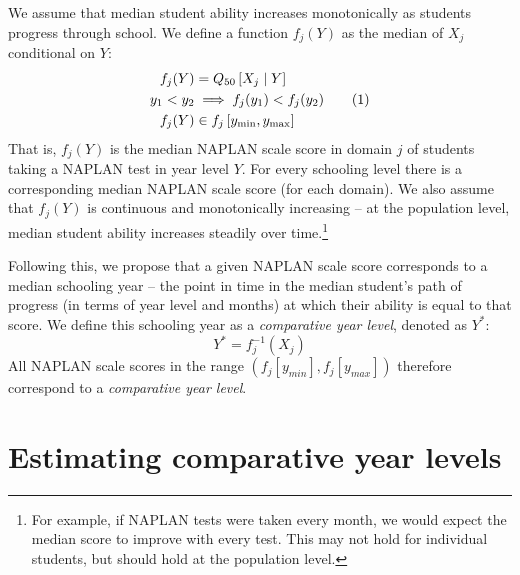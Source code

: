 We assume that median student ability increases monotonically as students progress through school. We define a function $f_{j}(Y)$ as the median of $X_{j}$ conditional on $Y$:
\newcommand\numberthis{\addtocounter{equation}{1}\tag{\theequation}}
\begin{align*}
 f_{j}(Y) &= Q_{50}\left[X_{j} \mid Y\right]  \\ 
 y_1 < y_2 &\implies f_{j}(y_{1}) < f_{j}(y_{2}) \numberthis\label{eq:median} \\ 
 f_{j}(Y) &\in f_{j}\left[y_{\min},y_{\max}\right] 
\end{align*}
That is, $f_{j}(Y)$ is the median NAPLAN scale score in domain ${j}$ of students taking a NAPLAN test in year level $Y$. For every schooling level there is a corresponding median NAPLAN scale score (for each domain). We also assume that $f_{j}(Y)$ is continuous and monotonically increasing -- at the population level, median student ability increases steadily over time.\footnote{For example, if NAPLAN tests were taken every month, we would expect the median score to improve with every test. This may not hold for individual students, but should hold at the population level.}

Following this, we propose that a given NAPLAN scale score corresponds to a median schooling year -- the point in time in the median student's path of progress (in terms of year level and months) at which their ability is equal to that score. We define this schooling year as a \textit{comparative year level}, denoted as $Y^{*}$:
\begin{equation} Y^{*} = f_{j}^{-1}\left(X_{j}\right) 
\end{equation}
All NAPLAN scale scores in the range $\left(f_{j}[y_{min}],f_{j}[y_{max}]\right)$ therefore correspond to a \textit{comparative year level}.

\section{Estimating comparative year levels}

